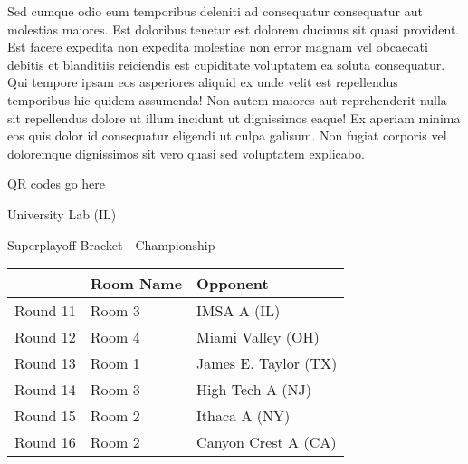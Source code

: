 \documentclass{article}%
\begin{document}
    Sed cumque odio eum temporibus deleniti ad consequatur consequatur aut molestias maiores. Est doloribus tenetur est dolorem ducimus sit quasi provident. Est facere expedita non expedita molestiae non error magnam vel obcaecati debitis et blanditiis reiciendis est cupiditate voluptatem ea soluta consequatur. Qui tempore ipsam eos asperiores aliquid ex unde velit est repellendus temporibus hic quidem assumenda!\newline%
\newline%
    Non autem maiores aut reprehenderit nulla sit repellendus dolore ut illum incidunt ut dignissimos eaque! Ex aperiam minima eos quis dolor id consequatur eligendi ut culpa galisum. Non fugiat corporis vel doloremque dignissimos sit vero quasi sed voluptatem explicabo.\newline%
\newline%
\vspace*{30pt}%
\begin{center}%
\begin{Huge}%
QR codes go here%
\end{Huge}%
\end{center}%
\newpage%
\begin{center}%
\begin{Huge}%
University Lab (IL)%
\end{Huge}%
\vspace*{8pt}%
\linebreak%
\begin{Large}%
Superplayoff Bracket {-} Championship%
\end{Large}%
\end{center}%
%
\begin{tabularx}{\textwidth}{|c|Y|Y|}%
\hline%
&Room Name&Opponent\\%
\hline%
Round 11&Room 3&IMSA A (IL)\\%
Round 12&Room 4&Miami Valley (OH)\\%
Round 13&Room 1&James E. Taylor (TX)\\%
Round 14&Room 3&High Tech A (NJ)\\%
Round 15&Room 2&Ithaca A (NY)\\%
Round 16&Room 2&Canyon Crest A (CA)\\%
\hline%
\end{tabularx}%
\vspace*{8pt}%
\linebreak%
\newline%
\newline%
\end{document}
